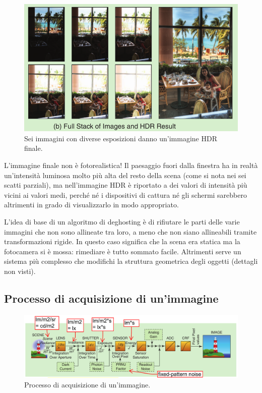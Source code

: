 \documentclass[a4paper,11pt]{article}
\begin{document}
\renewcommand{\thefigure}{3.20}
\begin{figure}[!h]
  \centering
    \includegraphics[scale=0.5]{images/3/hdr_example.png}
    \caption{Sei immagini con diverse esposizioni danno un'immagine HDR finale.}
\end{figure}

L'immagine finale non è fotorealistica! Il paesaggio fuori dalla finestra ha in realtà un'intensità luminosa molto più alta del resto della scena (come si nota nei sei scatti parziali),
ma nell'immagine HDR è riportato a dei valori di intensità più vicini ai valori medi, perché né i dispositivi di cattura né gli schermi
sarebbero altrimenti in grado di visualizzarlo in modo appropriato.
\par
L'idea di base di un algoritmo di deghosting è di rifiutare le parti delle varie immagini che non sono allineate tra loro,
a meno che non siano allineabili tramite transformazioni rigide. In questo caso significa che la scena
era statica ma la fotocamera si è mossa: rimediare è tutto sommato facile. Altrimenti serve un sistema
più complesso che modifichi la struttura geometrica degli oggetti (dettagli non visti).

\newpage

\subsection{Processo di acquisizione di un'immagine}

\renewcommand{\thefigure}{3.21}
\begin{figure}[!h]
  \centering
    \includegraphics[scale=0.25]{images/3/pipeline.png}
    \caption{Processo di acquisizione di un'immagine.}
\end{figure}
\end{document}
